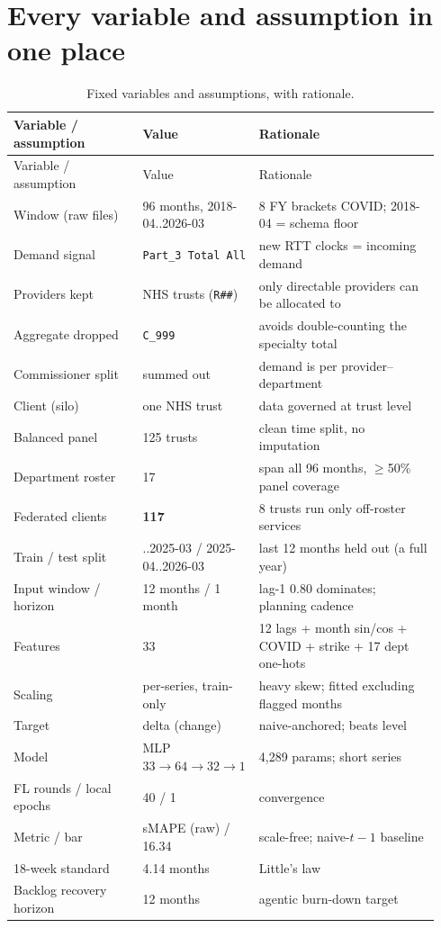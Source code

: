 \documentclass[11pt,a4paper]{article}
\newcommand{\code}[1]{\texttt{\small #1}}
\begin{document}
\section{Every variable and assumption in one place}\label{sec:vars}
\begin{longtable}{@{}p{0.30\linewidth} p{0.22\linewidth} p{0.42\linewidth}@{}}
\caption{Fixed variables and assumptions, with rationale.}\label{tab:vars}\\
\toprule Variable / assumption & Value & Rationale \\ \midrule \endfirsthead
\toprule Variable / assumption & Value & Rationale \\ \midrule \endhead \bottomrule \endfoot
Window (raw files) & 96 months, 2018-04..2026-03 & 8 FY brackets COVID; 2018-04 = schema floor \\
Demand signal & \code{Part\_3 Total All} & new RTT clocks = incoming demand \\
Providers kept & NHS trusts (\code{R\#\#}) & only directable providers can be allocated to \\
Aggregate dropped & \code{C\_999} & avoids double-counting the specialty total \\
Commissioner split & summed out & demand is per provider--department \\
Client (silo) & one NHS trust & data governed at trust level \\
Balanced panel & 125 trusts & clean time split, no imputation \\
Department roster & 17 & span all 96 months, $\geq$50\% panel coverage \\
Federated clients & \textbf{117} & 8 trusts run only off-roster services \\
Train / test split & ..2025-03 / 2025-04..2026-03 & last 12 months held out (a full year) \\
Input window / horizon & 12 months / 1 month & lag-1 $0.80$ dominates; planning cadence \\
Features & 33 & 12 lags + month sin/cos + COVID + strike + 17 dept one-hots \\
Scaling & per-series, train-only & heavy skew; fitted excluding flagged months \\
Target & delta (change) & naive-anchored; beats level \\
Model & MLP $33{\to}64{\to}32{\to}1$ & 4{,}289 params; short series \\
FL rounds / local epochs & 40 / 1 & convergence \\
Metric / bar & sMAPE (raw) / 16.34 & scale-free; naive-$t{-}1$ baseline \\
18-week standard & 4.14 months & Little's law \\
Backlog recovery horizon & 12 months & agentic burn-down target \\
\bottomrule
\end{longtable}
\end{document}

